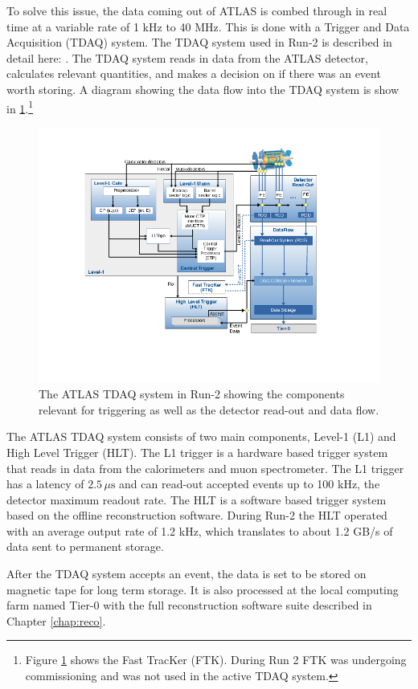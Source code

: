 	To solve this issue, the data coming out of ATLAS is combed through in real time at a variable rate of 1 kHz to 40 MHz. This is done with a Trigger and Data Acquisition (TDAQ) system. The TDAQ system used in Run-2 is described in detail here: \cite{ATLAS-trigger-Run2}. The TDAQ system reads in data from the ATLAS detector, calculates relevant quantities, and makes a decision on if there was an event worth storing. A diagram showing the data flow into the TDAQ system is show in \ref{fig:trigger-run2}.\footnote{Figure \ref{fig:trigger-run2} shows the Fast TracKer (FTK). During Run 2 FTK was undergoing commissioning and was not used in the active TDAQ system.} 
	\begin{figure}[!ht]
	\centering
	\includegraphics[width=\textwidth,keepaspectratio=true]{chapters/chapter3_experiment/images/Trigger_Run2.png}
	\caption{The ATLAS TDAQ system in Run-2 showing the components relevant for triggering as well as the detector read-out and data flow.}
	\label{fig:trigger-run2}
	\end{figure}
	The ATLAS TDAQ system consists of two main components, Level-1 (L1) and High Level Trigger (HLT). The L1 trigger is a hardware based trigger system that reads in data from the calorimeters and muon spectrometer. The L1 trigger has a latency of $2.5 \, \mu \mathrm{s}$ and can read-out accepted events up to 100 kHz, the detector maximum readout rate. The HLT is a software based trigger system based on the offline reconstruction software. During Run-2 the HLT operated with an average output rate of 1.2 kHz, which translates to about 1.2 GB/s of data sent to permanent storage.	

	After the TDAQ system accepts an event, the data is set to be stored on magnetic tape for long term storage. It is also processed at the local computing farm named Tier-0 with the full reconstruction software suite described in Chapter \ref{chap:reco}.


